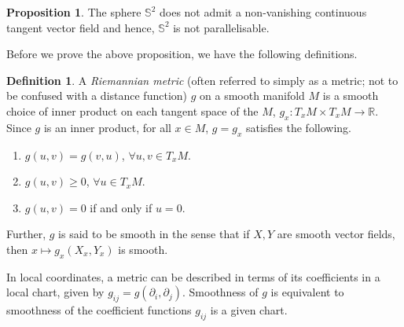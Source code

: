 \documentclass[12pt,a4paper]{article}
\numberwithin{equation}{section}
\theoremstyle{definition}
\newtheorem{definition}{Definition}[section]
\newtheorem{proposition}{Proposition}[section]
\theoremstyle{remark}
\begin{document}
\begin{proposition}
The sphere $\mathbb{S}^2$ does not admit a non-vanishing continuous tangent vector field and hence, $\mathbb{S}^2$ is not parallelisable.
\end{proposition}

%
%
Before we prove the above proposition, we have the following definitions.

\begin{definition}
A \textit{Riemannian metric} (often referred to simply as a metric; not to be confused with a distance function) $g$ on a smooth manifold $M$ is a smooth choice of inner product on each tangent space of the $M$, $g_x:T_xM\times T_xM\to\mathbb{R}$. Since $g$ is an inner product, for all $x\in M$, $g=g_x$ satisfies the following.
\begin{enumerate}
\item $g(u,v)=g(v,u)$, $\forall u,v\in T_xM$.
\item $g(u,v)\geq 0$, $\forall u\in T_xM$.
\item $g(u,v)=0$ if and only if $u=0$.
\end{enumerate}
Further, $g$ is said to be smooth in the sense that if $X,Y$ are smooth vector fields, then $x\mapsto g_x(X_x,Y_x)$ is smooth.

In local coordinates, a metric can be described in terms of its coefficients in a local chart, given by $g_{ij}=g(\partial_i,\partial_j)$. Smoothness of $g$ is equivalent to smoothness of the coefficient functions $g_{ij}$ is a given chart.
\end{definition}
\end{document}
